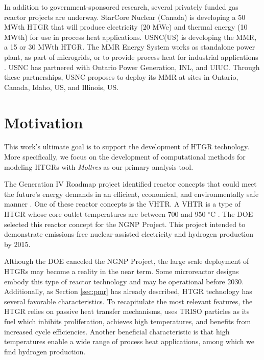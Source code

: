 In addition to government-sponsored research, several privately funded gas reactor projects are underway.
StarCore Nuclear \cite{star_core_nuclear_star_2015} (Canada) is developing a 50 MWth HTGR that will produce electricity (20 MWe) and thermal energy (10 MWth) for use in process heat applications.
\gls{USNC}(US) \cite{usnc_mmr_2019} is developing the \gls{MMR}, a 15 or 30 MWth HTGR.
The MMR Energy System works as standalone power plant, as part of microgrids, or to provide process heat for industrial applications \cite{world_nuclear_news_micro_2020}.
USNC has partnered with Ontario Power Generation, \gls{INL}, and \gls{UIUC}.
Through these partnerships, USNC proposes to deploy its MMR at sites in Ontario, Canada, Idaho, US, and Illinois, US.

\section{Motivation}

This work's ultimate goal is to support the development of \gls{HTGR} technology.
More specifically, we focus on the development of computational methods for modeling \glspl{HTGR} with \textit{Moltres} \cite{lindsay_introduction_2018} as our primary analysis tool.

The Generation IV Roadmap project identified reactor concepts that could meet the future's energy demands in an efficient, economical, and environmentally safe manner \cite{macdonald_ngnp_2003}.
One of these reactor concepts is the \gls{VHTR}.
A \gls{VHTR} is a type of HTGR whose core outlet temperatures are between 700 and 950 $^{\circ}$C \cite{gif_gif_2019}.
The \gls{DOE} selected this reactor concept for the \gls{NGNP} Project.
This project intended to demonstrate emissions-free nuclear-assisted electricity and hydrogen production by 2015.

Although the \gls{DOE} canceled the \gls{NGNP} Project, the large scale deployment of HTGRs may become a reality in the near term.
Some microreactor designs embody this type of reactor technology and may be operational before 2030.
Additionally, as Section \ref{sec:pmr} has already described, HTGR technology has several favorable characteristics.
To recapitulate the most relevant features, the \gls{HTGR} relies on passive heat transfer mechanisms, uses TRISO particles as its fuel which inhibits proliferation, achieves high temperatures, and benefits from increased cycle efficiencies.
Another beneficial characteristic is that high temperatures enable a wide range of process heat applications, among which we find hydrogen production.

